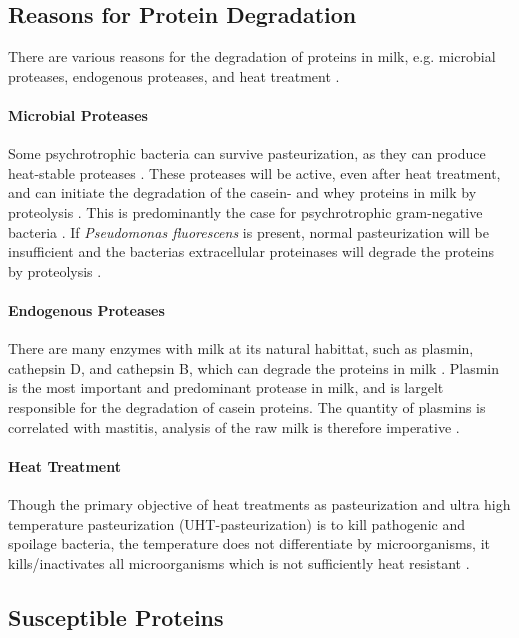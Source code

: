 \subsection{Reasons for Protein Degradation}
There are various reasons for the degradation of proteins in milk, e.g. microbial proteases, endogenous proteases, and heat treatment \cite*{a02_proteases_and_protein_degradation}. 

\paragraph*{Microbial Proteases}
    Some psychrotrophic bacteria can survive pasteurization, as they can produce heat-stable proteases \cite*{s01_heat_treatment_1}. These proteases will be active, even after heat treatment, and can initiate the degradation of the casein- and whey proteins in milk by proteolysis \cite*{b02_heat_induced_changes_in_milk}. This is predominantly the case for psychrotrophic gram-negative bacteria \cite*{s01_heat_treatment_1}.
    If \textit{Pseudomonas fluorescens} is present, normal pasteurization will be insufficient and the bacterias extracellular proteinases will degrade the proteins by proteolysis \cite*{s01_heat_treatment_1}.

\paragraph*{Endogenous Proteases}
    There are many enzymes with milk at its natural habittat, such as plasmin, cathepsin D, and cathepsin B, which can degrade the proteins in milk \cite*{a02_proteases_and_protein_degradation}. Plasmin is the most important and predominant protease in milk, and is largelt responsible for the degradation of casein proteins. The quantity of plasmins is correlated with mastitis, analysis of the raw milk is therefore imperative \cite*{a02_proteases_and_protein_degradation}.

\paragraph*{Heat Treatment}
    Though the primary objective of heat treatments as pasteurization and ultra high temperature pasteurization (UHT-pasteurization) is to kill pathogenic and spoilage bacteria, the temperature does not differentiate by microorganisms, it kills/inactivates all microorganisms which is not sufficiently heat resistant \cite*{b02_heat_induced_changes_in_milk}.

\subsection{Susceptible Proteins}
